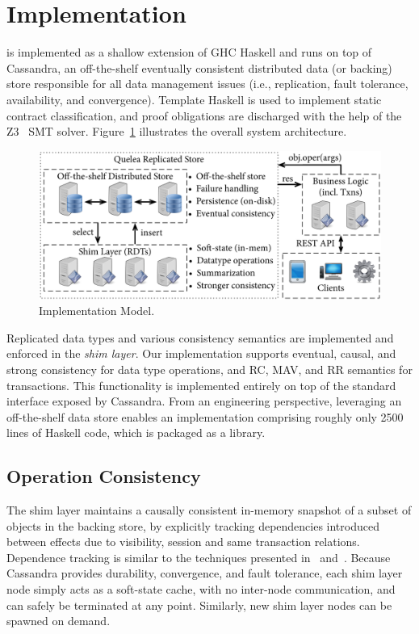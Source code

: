 \section{Implementation}
\label{sec:impl}

\name is implemented as a shallow extension of GHC Haskell and runs on top of
Cassandra, an off-the-shelf eventually consistent distributed data (or backing)
store responsible for all data management issues (i.e., replication, fault
tolerance, availability, and convergence).  Template Haskell is used to
implement static contract classification, and proof obligations are discharged
with the help of the Z3~\cite{Z3} SMT solver. Figure~\ref{fig:impl_mod}
illustrates the overall system architecture.

\begin{figure}
\begin{center}
\includegraphics[width=\columnwidth]{Figures/ImplModel}
\end{center}
\caption{Implementation Model.}
\label{fig:impl_mod}
\end{figure}

Replicated data types and various consistency semantics are implemented and
enforced in the \emph{shim layer}. Our implementation supports eventual,
causal, and strong consistency for data type operations, and RC, MAV, and RR
semantics for transactions.  This functionality is implemented entirely on
top of the standard interface exposed by Cassandra. From an engineering
perspective, leveraging an off-the-shelf data store enables an
implementation comprising roughly only 2500 lines of Haskell code, which is
packaged as a library.

\subsection{Operation Consistency}

The shim layer maintains a causally consistent in-memory snapshot of a subset
of objects in the backing store, by explicitly tracking dependencies introduced
between effects due to visibility, session and same transaction relations.
Dependence tracking is similar to the techniques presented in~\cite{BoltOn}
and~\cite{Eiger}. Because Cassandra provides durability, convergence, and fault
tolerance, each shim layer node simply acts as a soft-state cache, with no
inter-node communication, and can safely be terminated at any point. Similarly,
new shim layer nodes can be spawned on demand.

